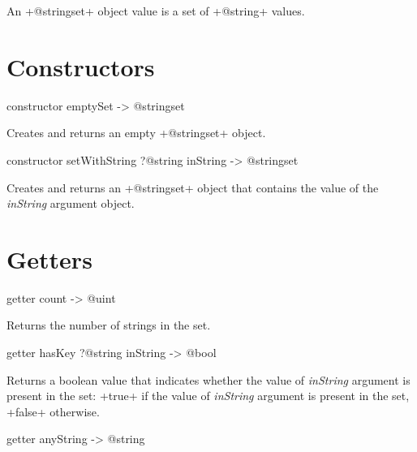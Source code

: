 

An \ggs+@stringset+ object value is a set of \ggs+@string+ values.\\

\section{Constructors}


\begin{galgas}
constructor emptySet -> @stringset
\end{galgas}


Creates and returns an empty \ggs+@stringset+ object.


\begin{galgas}
constructor setWithString ?@string inString -> @stringset
\end{galgas}


Creates and returns an \ggs+@stringset+ object that contains the value of the \emph{inString} argument object.

\section{Getters}


\begin{galgas}
getter count -> @uint
\end{galgas}

Returns the number of strings in the set.




\begin{galgas}
getter hasKey ?@string inString -> @bool
\end{galgas}

Returns a boolean value that indicates whether the value of \emph{inString} argument is present in the set: \ggs+true+ if the value of \emph{inString} argument is present in the set, \ggs+false+ otherwise.



\begin{galgas}
getter anyString -> @string
\end{galgas}

